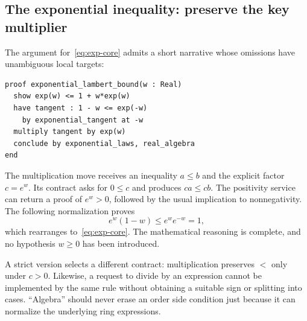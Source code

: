 \documentclass[11pt,a4paper]{article}
\theoremstyle{remark}
\begin{document}
\subsection{The exponential inequality: preserve the key multiplier}
The argument for~\eqref{eq:exp-core} admits a short narrative whose omissions have unambiguous local targets:
\par\noindent\begin{minipage}{\linewidth}
\begin{lstlisting}[caption={Proposed order-preserving calculation.}]
proof exponential_lambert_bound(w : Real)
  show exp(w) <= 1 + w*exp(w)
  have tangent : 1 - w <= exp(-w)
    by exponential_tangent at -w
  multiply tangent by exp(w)
  conclude by exponential_laws, real_algebra
end
\end{lstlisting}
\end{minipage}\par
The multiplication move receives an inequality $a\leq b$ and the explicit factor $c=e^w$. Its contract asks for $0\leq c$ and produces $ca\leq cb$. The positivity service can return a proof of $e^w>0$, followed by the usual implication to nonnegativity. The following normalization proves
\[
e^w(1-w)\leq e^we^{-w}=1,
\]
which rearranges to~\eqref{eq:exp-core}. The mathematical reasoning is complete, and no hypothesis $w\geq0$ has been introduced.

A strict version selects a different contract: multiplication preserves $<$ only under $c>0$. Likewise, a request to divide by an expression cannot be implemented by the same rule without obtaining a suitable sign or splitting into cases. ``Algebra'' should never erase an order side condition just because it can normalize the underlying ring expressions.
\end{document}
